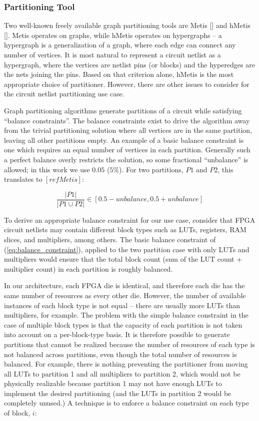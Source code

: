 \subsubsection{Partitioning Tool}
Two well-known freely available graph partitioning tools are Metis [] and hMetis []. Metis operates on graphs, while hMetis operates on hypergraphs -- a hypergraph is a generalization of a graph, where each edge can connect any number of vertices. It is most natural to represent a circuit netlist as a hypergraph, where the vertices are netlist pins (or blocks) and the hyperedges are the nets joining the pins. Based on that criterion alone, hMetis is the most appropriate choice of partitioner. However, there are other issues to consider for the circuit netlist partitioning use case.

Graph partitioning algorithms generate partitions of a circuit while satisfying ``balance constraints''. The balance constraints exist to drive the algorithm away from the trivial partitioning solution where all vertices are in the same partition, leaving all other partitions empty. An example of a basic balance constraint is one which requires an equal number of vertices in each partition. Generally such a perfect balance overly restricts the solution, so some fractional ``unbalance'' is allowed; in this work we use $0.05$ ($5\%$). For two partitions, $P1$ and $P2$, this translates to $[ref Metis]$:

\begin{equation}\label{eq:balance_constraint}
\frac{|P1|}{|P1 \cup P2|} \in [0.5 - unbalance, 0.5 + unbalance]
\end{equation}

To derive an appropriate balance constraint for our use case, consider that FPGA circuit netlists may contain different block types such as LUTs, registers, RAM slices, and multipliers, among others. The basic balance constraint of (\ref{eq:balance_constraint}), applied to the two partition case with only LUTs and multipliers would ensure that the total block count (sum of the LUT count + multiplier count) in each partition is roughly balanced.

In our architecture, each FPGA die is identical, and therefore each die has the same number of resources as every other die. However, the number of available instances of each block type is not equal -- there are usually more LUTs than multipliers, for example. The problem with the simple balance constraint in the case of multiple block types is that the capacity of each partition is not taken into account on a per-block-type basis. It is therefore possible to generate partitions that cannot be realized because the number of resources of each type is not balanced across partitions, even though the total number of resources is balanced. For example, there is nothing preventing the partitioner from moving all LUTs to partition 1 and all multipliers to partition 2, which would not be physically realizable because partition 1 may not have enough LUTs to implement the desired partitioning (and the LUTs in partition 2 would be completely unused.) A technique is to enforce a balance constraint on each type of block, $i$:

